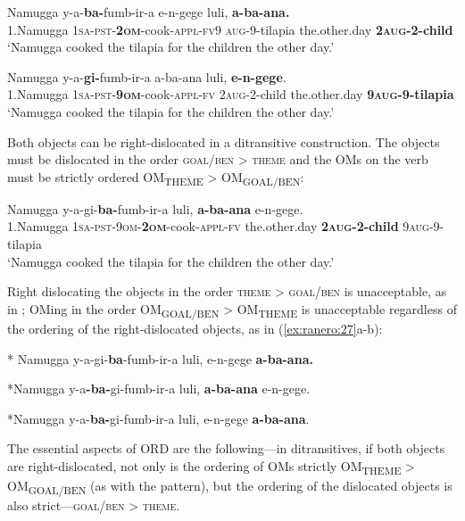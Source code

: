 \documentclass[output=paper
,newtxmath
,modfonts
,nonflat]{langsci/langscibook}
\begin{document}
\ea    \label{ex:ranero:23}
\gll Namugga    y-a-\textbf{ba-}fumb-ir-a                     e-n-gege         luli,            \textbf{a-ba-ana.}\\
1.Namugga \textsc{1sa-pst-}\textbf{\textsc{2om}}{}-cook-\textsc{appl-fv}9 \textsc{aug}{}-9-tilapia the.other.day \textbf{2\textsc{aug}}\textbf{{}-2-child}\\
\glt ‘Namugga cooked the tilapia for the children the other day.’
\z

\ea\label{ex:ranero:24}
\gll Namugga    y-a-\textbf{gi-}fumb-ir-a        a-ba-ana        luli,    \textbf{e-n-gege}.\\
1.Namugga \textsc{1sa-pst-}\textbf{\textsc{9om}}{}-cook-\textsc{appl-fv} 2\textsc{aug}{}-2-child the.other.day \textbf{9\textsc{aug}}\textbf{{}-9-tilapia}\\
\glt ‘Namugga cooked the tilapia for the children the other day.’
\z

Both objects can be right-dislocated in a ditransitive construction. The objects must be dislocated in the order \textsc{goal/ben > theme} and the OMs on the verb must be strictly ordered OM\textsubscript{THEME} > OM\textsubscript{GOAL/BEN}:


\ea\label{ex:ranero:25}
\gll Namugga     y-a-gi{}-\textbf{ba-}fumb-ir-a                     luli,                \textbf{a-ba-ana}      e-n-gege.\\
1.Namugga \textsc{1sa-pst-9om}\textsc{{}-}\textbf{\textsc{2om}}{}-cook-\textsc{appl-fv} the.other.day \textbf{2\textsc{aug}}\textbf{{}-2-child} 9\textsc{aug}{}-9-tilapia\\
\glt ‘Namugga cooked the tilapia for the children the other day.’
\z

Right dislocating the objects in the order \textsc{theme > goal/ben} is unacceptable, as in ; OMing in the order OM\textsubscript{GOAL/BEN} > OM\textsubscript{THEME} is unacceptable regardless of the ordering of the right-dislocated objects, as in (\ref{ex:ranero:27}a-b):

\ea\label{ex:ranero:26}
* Namugga y-a-gi{}-\textbf{ba}{}-fumb-ir-a luli, e-n-gege \textbf{a-ba-ana.}
\z

\ea\label{ex:ranero:27}
\ea\label{ex:ranero:27a}

*Namugga y-a\textbf{{}-ba-}gi{}-fumb-ir-a luli, \textbf{a-ba-ana} e-n-gege.

\ex\label{ex:ranero:27b}
*Namugga y-a-\textbf{ba-}gi{}-fumb-ir-a luli, e-n-gege \textbf{a-ba-ana}.
\z
\z

The essential aspects of ORD are the following—in ditransitives, if both objects are right-dislocated, not only is the ordering of OMs strictly OM\textsubscript{THEME} > OM\textsubscript{GOAL/BEN} (as with the  pattern), but the ordering of the dislocated objects is also strict—\textsc{goal/ben > theme}. 
\end{document}
